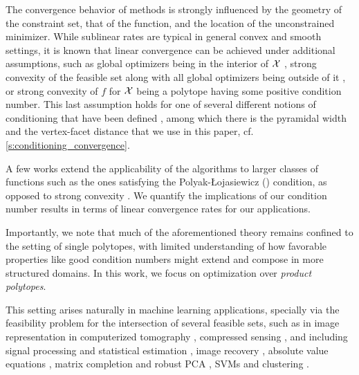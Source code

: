 \documentclass[twoside]{article}
\begin{document}
The convergence behavior of \FW{} methods is strongly influenced by the geometry of the constraint set, that of the function, and the location of the unconstrained minimizer. While sublinear rates are typical in general convex and smooth settings, it is known that linear convergence can be achieved under additional assumptions, such as global optimizers being in the interior of $\mathcal{X}$ \citep{wolfe1970convergence,guelat1986some}, strong convexity of the feasible set along with all global optimizers being outside of it \citep{levitin1966constrained}, or strong convexity of $f$ for $\mathcal{X}$ being a polytope having some positive condition number. This last assumption holds for one of several different notions of conditioning that have been defined \citep{lacoste2013affine,GH15,LJ15,BS15,penya2016vonneumann,PR18}, %
among which there is the pyramidal width and the vertex-facet distance that we use in this paper, cf. \cref{s:conditioning_convergence}.

A few works extend the applicability of the algorithms to larger classes of functions such as the ones satisfying the Polyak-Łojasiewicz () condition, as opposed to strong convexity \citep{BS15,BCC+23}.
We quantify the implications of our condition number results in terms of linear convergence rates for our applications. 

Importantly, we note that much of the aforementioned theory remains confined to the setting of single polytopes, with limited understanding of how favorable properties like good condition numbers might extend and compose in more structured domains. In this work, we focus on optimization over \emph{product polytopes}.

This setting arises naturally in machine learning applications, specially via the feasibility problem for the intersection of several feasible sets, such as in image representation in computerized tomography \citep{CCC+09}, compressed sensing \citep{CCP12},
and including signal processing and statistical estimation \citep{SY98,CP10proximal}, image recovery \citep{Com96}, absolute value equations \citep{ACT23}, matrix completion \citep{RSV12} and robust PCA \citep{MA18}, SVMs \citep{LJS+13} and clustering \citep{BRZ23}.
\end{document}
